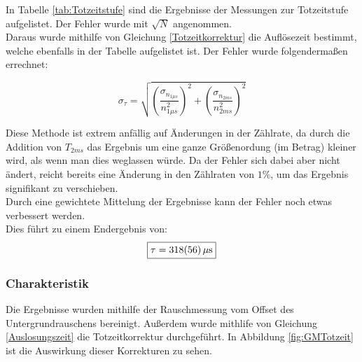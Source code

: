 \documentclass[12pt,a4paper]{article}
\begin{document}
In Tabelle \ref{tab:Totzeitstufe} sind die Ergebnisse der Messungen zur Totzeitstufe aufgelistet. Der Fehler wurde mit $\sqrt{N}$ angenommen.\\
Daraus wurde mithilfe von Gleichung \ref{Totzeitkorrektur} die Auflösezeit bestimmt, welche ebenfalls in der Tabelle aufgelistet ist. Der Fehler wurde folgendermaßen errechnet:

\begin{equation}
\sigma_{\tau} = \sqrt{\left(\dfrac{\sigma_{n_{1\mu s}}}{n_{1\mu s}^{2}}\right)^2 + \left(\dfrac{\sigma_{n_{2ms}}}{n_{2ms}^{2}}\right)^2}
\end{equation}

Diese Methode ist extrem anfällig auf Änderungen in der Zählrate, da durch die Addition von $T_{2ms}$ das Ergebnis um eine ganze Größenordung (im Betrag) kleiner wird, als wenn man dies weglassen würde. Da der Fehler sich dabei aber nicht ändert, reicht bereits eine Änderung in den Zählraten von $1\%$, um das Ergebnis signifikant zu verschieben.\\
Durch eine gewichtete Mittelung der Ergebnisse kann der Fehler noch etwas verbessert werden.\\
Dies führt zu einem Endergebnis von:
\begin{equation}
\boxed{\tau = \SI{318\pm 56}{\mu s}}
\end{equation}


\subsubsection{Charakteristik}
\label{GMchar}

Die Ergebnisse wurden mithilfe der Rauschmessung vom Offset des Untergrundrauschens bereinigt.
Außerdem wurde mithlife von Gleichung \ref{Auslosungszeit} die Totzeitkorrektur durchgeführt. In Abbildung \ref{fig:GMTotzeit} ist die Auswirkung dieser Korrekturen zu sehen.
\end{document}
